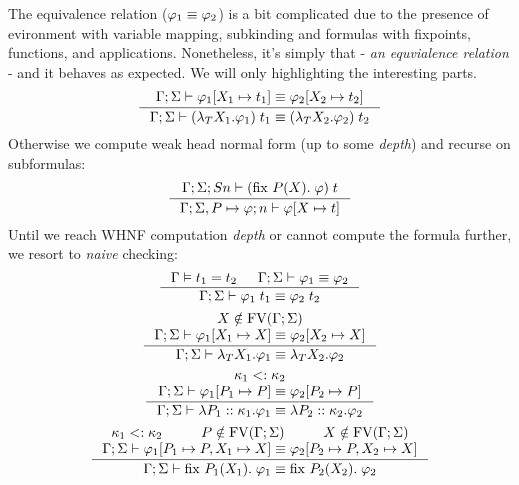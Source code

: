 \documentclass[english, mgr]{iithesis}
\begin{document}
The equivalence relation ($\varphi_1 \equiv \varphi_2$) is a bit complicated
due to the presence of evironment with variable mapping, subkinding and formulas
with fixpoints, functions, and applications.
Nonetheless, it's simply that - \textit{an equvialence relation} - and it
behaves as expected. We will only highlighting the interesting parts.
\begin{eqnarray*}
  \inference{
    \jgmnt[\Gamma; \Sigma]{\formphi_1[\termv_1 \mapsto  \term_1] \equiv \formphi_2[\termv_2 \mapsto \term_2] }
    }{
    \jgmnt[\Gamma; \Sigma]{(\fLamTerm{\termv_1}\formphi_1) \fAppTerm \term_1 \equiv (\fLamTerm{\termv_2}\formphi_2) \fAppTerm \term_2}
  }
\end{eqnarray*}
Otherwise we compute weak head normal form (up to some \textit{depth}) and recurse on subformulas:
\begin{eqnarray*}
  \inference{
    \jgmnt[\Gamma; \Sigma; S n]{(\fix{P}{\termv}\formphi) \fAppTerm \term}
    }{
    \jgmnt[\Gamma; \Sigma, P \mapsto \formphi; n]{\formphi[\termv \mapsto \term]}
  }
\end{eqnarray*}
Until we reach WHNF computation \textit{depth} or cannot compute the formula further,
we resort to \textit{naive} checking:
\begin{eqnarray*}
  \inference{
    \cjgmnt[\Gamma]{\term_1 \ceq \term_2} &
    \jgmnt[\Gamma; \Sigma]{\formphi_1 \equiv \formphi_2 }
    }{
    \jgmnt[\Gamma; \Sigma]{\formphi_1 \fAppTerm \term_1 \equiv \formphi_2 \fAppTerm \term_2 }
  }
\end{eqnarray*}
\begin{eqnarray*}
  \inference{
    \termv \notin \fv[\Gamma; \Sigma] \\
    \jgmnt[\Gamma; \Sigma]{\formphi_1[\termv_1 \mapsto \termv] \equiv \formphi_2[\termv_2 \mapsto \termv] }
    }{
    \jgmnt[\Gamma; \Sigma]{\fLamTerm{\termv_1}\formphi_1 \equiv \fLamTerm{\termv_2}\formphi_2 }
  }
\end{eqnarray*}
\begin{eqnarray*}
  \inference{
    \kind_1 \subkind \kind_2 \\
    \jgmnt[\Gamma; \Sigma]{\formphi_1[P_1 \mapsto P] \equiv \formphi_2[P_2 \mapsto P] }
    }{
    \jgmnt[\Gamma; \Sigma]{\fLamForm{P_1}{\kind_1}{\formphi_1} \equiv \fLamForm{P_2}{\kind_2}{\formphi_2}}
  }
\end{eqnarray*}
\begin{eqnarray*}
  \inference{
    \kind_1 \subkind \kind_2 &
    P \notin \fv[\Gamma; \Sigma] & \termv \notin \fv[\Gamma; \Sigma] \\
    \jgmnt[\Gamma; \Sigma]{\formphi_1[P_1 \mapsto P, \termv_1 \mapsto \termv] \equiv \formphi_2[P_2 \mapsto P, \termv_2 \mapsto \termv] }
    }{
    \jgmnt[\Gamma; \Sigma]{\fix{P_1}{\termv_1}\formphi_1 \equiv \fix{P_2}{\termv_2}\formphi_2}
  }
\end{eqnarray*}
\end{document}
